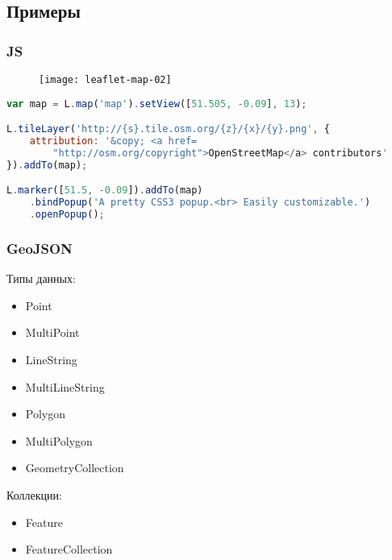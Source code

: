 \subsection{Примеры}
\begin{frame}[fragile]
    \frametitle{JS}
    \begin{figure}[ht!]
        \texttt{[image: leaflet-map-02]}
    \end{figure}
    \begin{lstlisting}[language=JavaScript]
var map = L.map('map').setView([51.505, -0.09], 13);

L.tileLayer('http://{s}.tile.osm.org/{z}/{x}/{y}.png', {
    attribution: '&copy; <a href=
        "http://osm.org/copyright">OpenStreetMap</a> contributors'
}).addTo(map);

L.marker([51.5, -0.09]).addTo(map)
    .bindPopup('A pretty CSS3 popup.<br> Easily customizable.')
    .openPopup();
    \end{lstlisting}
\end{frame}

\begin{frame}
    \frametitle{GeoJSON}
    \begin{minipage}[h]{0.49\textwidth}
        Типы данных:
        \begin{itemize}
            \item Point
            \item MultiPoint
            \item LineString
            \item MultiLineString
            \item Polygon
            \item MultiPolygon
            \item GeometryCollection
        \end{itemize}
    \end{minipage}
    \begin{minipage}[h]{0.49\textwidth}
        Коллекции:
        \begin{itemize}
            \item Feature
            \item FeatureCollection
        \end{itemize}
    \end{minipage}
\end{frame}


